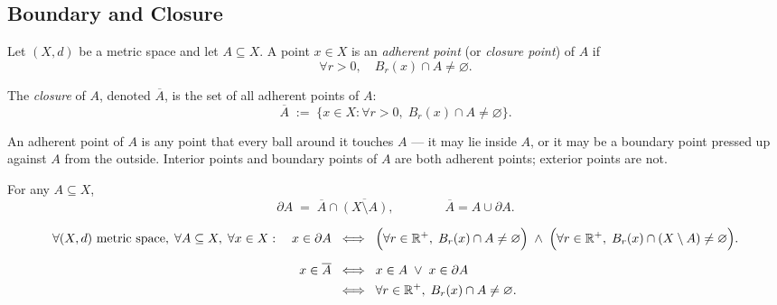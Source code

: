 

\subsection{Boundary and Closure}
\label{sec:boundary-closure}

\begin{tcolorbox}[colback=propbox, colframe=propborder, arc=2pt,
  left=6pt, right=6pt, top=4pt, bottom=4pt,
  title={\small\textbf{Definition (Adherent Point, Closure)}},
  fonttitle=\small\bfseries]
\begin{definition}
\label{def:adherent-point}
Let $(X,d)$ be a metric space and let $A \subseteq X$.
A point $x \in X$ is an \emph{adherent point} (or \emph{closure point}) of $A$ if
\[
  \forall r > 0,\quad B_r(x) \cap A \neq \varnothing.
\]
\end{definition}

\begin{definition}[Closure]
\label{def:closure}
The \emph{closure} of $A$, denoted $\overline{A}$, is the set of all adherent
points of $A$:
\[
  \overline{A}
  \;:=\;
  \{x \in X : \forall r > 0,\; B_r(x) \cap A \neq \varnothing\}.
\]
\end{definition}
\end{tcolorbox}

\begin{remark*}
An adherent point of $A$ is any point that every ball around it touches $A$
--- it may lie inside $A$, or it may be a boundary point pressed up against $A$
from the outside.
Interior points and boundary points of $A$ are both adherent points;
exterior points are not.
\end{remark*}

\begin{theorem}
\label{thm:boundary-closure}
For any $A \subseteq X$,
\[
  \partial A
  \;=\;
  \overline{A} \cap \overline{(X \setminus A)},
  \qquad\qquad
  \overline{A} = A \cup \partial A.
\]
\end{theorem}

\begin{remark*}
\begin{align*}
\forall (X,d)\ \text{metric space},\;
\forall A \subseteq X,\;
\forall x \in X:\quad
x \in \partial A
&\;\iff\;
\Bigl(
  \forall r \in \mathbb{R}^{+},\;
  B_r(x) \cap A \neq \varnothing
\Bigr)
\;\land\;
\Bigl(
  \forall r \in \mathbb{R}^{+},\;
  B_r(x) \cap (X \setminus A) \neq \varnothing
\Bigr). \\[6pt]
x \in \overline{A}
&\;\iff\;
x \in A \;\lor\; x \in \partial A \\
&\;\iff\;
\forall r \in \mathbb{R}^{+},\;
B_r(x) \cap A \neq \varnothing.
\end{align*}
\end{remark*}


